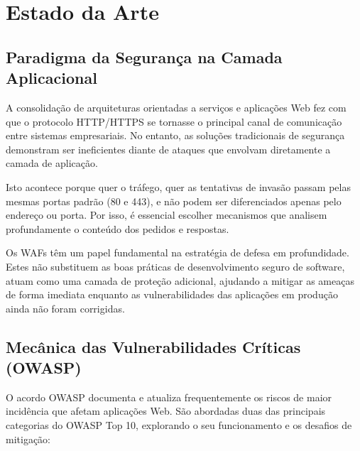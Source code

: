 \documentclass[11pt,a4paper]{article}
\begin{document}
\clearpage
\section{Estado da Arte}
\label{sec:estado_arte}

\subsection{Paradigma da Segurança na Camada Aplicacional}

A consolidação de arquiteturas orientadas a serviços e aplicações Web fez com que o protocolo HTTP/HTTPS se tornasse o principal canal de comunicação entre sistemas empresariais. No entanto, as soluções tradicionais de segurança demonstram ser ineficientes diante de ataques que envolvam diretamente a camada de aplicação.

Isto acontece porque quer o tráfego, quer as tentativas de invasão passam pelas mesmas portas padrão (80 e 443), e não podem ser diferenciados apenas pelo endereço ou porta. Por isso, é essencial escolher mecanismos que analisem profundamente o conteúdo dos pedidos e respostas.

Os WAFs têm um papel fundamental na estratégia de defesa em profundidade. Estes não substituem as boas práticas de desenvolvimento seguro de software, atuam como uma camada de proteção adicional, ajudando a mitigar as ameaças de forma imediata enquanto as vulnerabilidades das aplicações em produção ainda não foram corrigidas.

\subsection{Mecânica das Vulnerabilidades Críticas (OWASP)}
O acordo OWASP documenta e atualiza frequentemente os riscos de maior incidência que afetam aplicações Web. São abordadas duas das principais categorias do OWASP Top 10, explorando o seu funcionamento e os desafios de mitigação:
\end{document}
